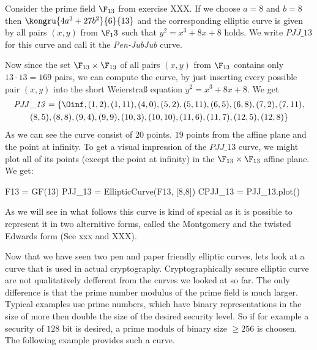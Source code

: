 \begin{example} Consider the prime field $\F_{13}$ from exercise XXX. If we choose $a=8$ and $b=8$ then $\kongru{4a^3+ 27b^2}{6}{13}$ and the corresponding elliptic curve is given by all pairs $(x,y)$ from $\F_13$ such that $y^2=x^3+8x+8$ holds. We write $\mathit{PJJ\_13}$ for this curve and call it the \textit{Pen-JubJub} curve.

Now since the set $\F_{13}\times \F_{13}$ of all pairs $(x,y)$ from $\F_{13}$ contains only $13\cdot 13=169$ pairs, we can compute the curve, by just inserting every possible pair $(x,y)$ into the short Weierstraß equation $y^2 = x^3 +8x +8$.  We get 
\begin{multline*}
\mathit{PJJ\_13} = \{\Oinf, (1, 2), (1, 11), (4, 0), (5, 2), (5, 11), (6, 5), (6, 8), (7,2), (7, 11), \\ (8, 5), (8, 8), (9, 4), (9, 9), (10, 3), (10,
10), (11, 6), (11, 7), (12, 5), (12, 8)\}
\end{multline*}
As we can see the curve consist of $20$ points. $19$ points from the affine plane and the point at infinity.
To get a visual impression of the $\mathit{PJJ\_13}$ curve, we might plot all of its points (except the point at infinity) in the $\F_{13}\times \F_{13}$ affine plane. We get: 
\begin{sagesilent}
F13 = GF(13)
PJJ_13 = EllipticCurve(F13, [8,8])
CPJJ_13 = PJJ_13.plot()
\end{sagesilent}
\begin{center} 
\end{center}
As we will see in what follows this curve is kind of special as it is possible to represent it in two alternitive forms, called the Montgomery and the twisted Edwards form (See xxx and XXX).
\end{example}
Now that we have seen two pen and paper friendly elliptic curves, lets look at a curve that is used in actual cryptography. Cryptographically secure elliptic curve are not qualitatively defferent from the curves we looked at so far. The only difference is that the prime number modulus of the prime field is much larger. Typical examples use prime numbers, which have binary representations in the size of more then double the size of the desired security level. So if for example a security of $128$ bit is desired, a prime moduls of binary size $\geq 256$ is choosen. The following example provides such a curve. 
